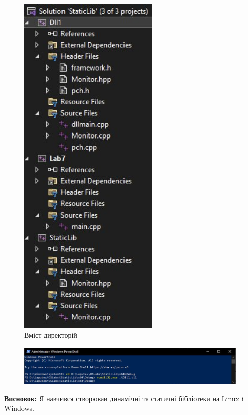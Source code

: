 \documentclass[12pt]{extarticle}
\begin{document}
\begin{figure}[H]
    \centering
    \includegraphics[width=0.60\textwidth]{lfolder}
    \caption{Вміст директорій}
\end{figure}

\begin{figure}[H]
    \centering
    \includegraphics[width=0.99\textwidth]{cmd}
    \caption{}
\end{figure}

\textbf{Висновок:}
Я навчився створюваи динамічні та статичні бібліотеки на Linux i Windows.
 
\end{document}
